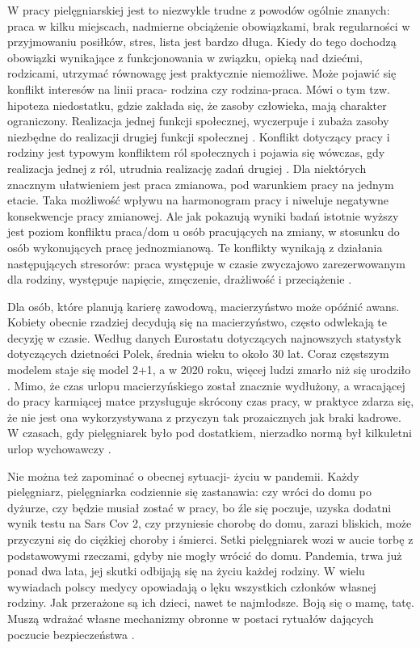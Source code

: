 \documentclass[a4paper,12pt,twoside,openany]{report}
\begin{document}
W pracy pielęgniarskiej jest to niezwykle trudne z powodów ogólnie znanych: praca w kilku miejscach, nadmierne obciążenie obowiązkami, brak regularności w przyjmowaniu posiłków, stres, lista jest bardzo długa. Kiedy do tego dochodzą obowiązki wynikające z funkcjonowania w związku, opieką nad dziećmi, rodzicami, utrzymać równowagę jest praktycznie niemożliwe. Może pojawić się konflikt interesów na linii praca- rodzina czy rodzina-praca. Mówi o tym tzw. hipoteza niedostatku,  gdzie zakłada się, że zasoby człowieka, mają charakter ograniczony. Realizacja jednej funkcji społecznej, wyczerpuje i zubaża zasoby niezbędne do realizacji drugiej funkcji społecznej \cite{hipoteza}. Konflikt dotyczący pracy i rodziny jest typowym konfliktem ról społecznych i pojawia się wówczas, gdy realizacja jednej z ról, utrudnia realizację zadań drugiej \cite{relacja}. Dla niektórych znacznym ułatwieniem jest praca zmianowa, pod warunkiem pracy na jednym etacie. Taka możliwość wpływu na harmonogram pracy i niweluje negatywne konsekwencje pracy zmianowej. Ale jak pokazują wyniki badań  istotnie wyższy jest poziom konfliktu praca/dom u osób pracujących na zmiany, w stosunku do osób wykonujących pracę jednozmianową. Te konflikty wynikają z działania następujących stresorów: praca występuje w czasie zwyczajowo zarezerwowanym dla rodziny, występuje napięcie, zmęczenie, drażliwość i przeciążenie \cite{konflikt}.
  
Dla osób, które planują karierę zawodową, macierzyństwo może opóźnić awans. Kobiety obecnie rzadziej decydują się na macierzyństwo, często odwlekają te decyzję w czasie. Według danych Eurostatu dotyczących najnowszych statystyk dotyczących dzietności Polek, średnia wieku to około 30 lat. Coraz częstszym modelem staje się model 2+1, a w 2020 roku, więcej ludzi zmarło niż się urodziło \cite{dzieci}. Mimo, że czas urlopu macierzyńskiego został znacznie wydłużony, a wracającej do pracy karmiącej matce przysługuje skrócony czas pracy, w praktyce zdarza się, że nie jest ona wykorzystywana z przyczyn tak prozaicznych jak braki kadrowe. W czasach, gdy pielęgniarek było pod dostatkiem, nierzadko normą był kilkuletni urlop wychowawczy \cite{urlop}.

Nie można też zapominać o obecnej sytuacji- życiu w pandemii. Każdy pielęgniarz, pielęgniarka codziennie się zastanawia: czy wróci do domu po dyżurze, czy będzie musiał zostać w pracy, bo źle się poczuje, uzyska dodatni wynik testu na Sars Cov 2, czy przyniesie chorobę do domu, zarazi bliskich, może przyczyni się do ciężkiej choroby i śmierci. Setki pielęgniarek wozi w aucie torbę z podstawowymi rzeczami, gdyby nie mogły wrócić do domu. Pandemia, trwa już ponad dwa lata, jej skutki odbijają się na życiu każdej rodziny. W wielu wywiadach polscy medycy opowiadają o lęku wszystkich członków własnej rodziny. Jak przerażone są ich dzieci, nawet te najmłodsze. Boją się o mamę, tatę. Muszą wdrażać własne mechanizmy obronne w postaci rytuałów dających poczucie bezpieczeństwa  \cite{wywiad}.
\end{document}
